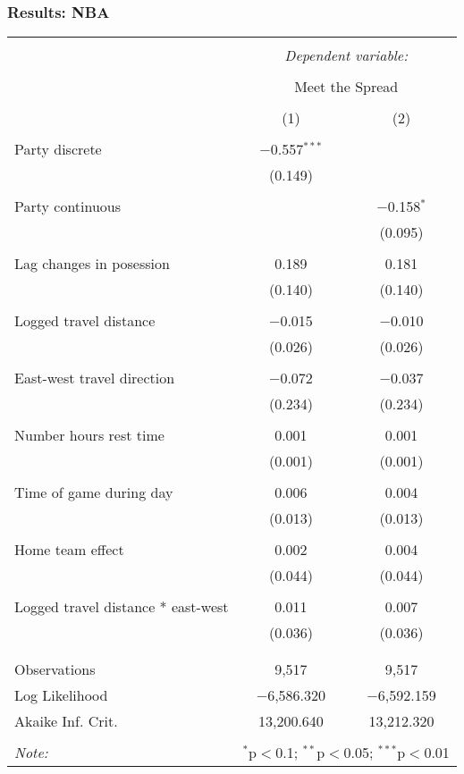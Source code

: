 \documentclass{beamer}
\begin{document}
\begin{frame}   \frametitle{Results: NBA}
  \vspace{-2pt}
  \centering
  \tiny{ %
\begin{tabular}{@{\extracolsep{5pt}}lcc}  \\[-1.8ex]\hline  \hline \\[-1.8ex]   & \multicolumn{2}{c}{\textit{Dependent variable:}} \\  \cline{2-3}  \\[-1.8ex] & \multicolumn{2}{c}{Meet the Spread} \\  \\[-1.8ex] & (1) & (2)\\  \hline \\[-1.8ex]   Party discrete & $-$0.557$^{***}$ &  \\    & (0.149) &  \\    & & \\   Party continuous &  & $-$0.158$^{*}$ \\    &  & (0.095) \\    & & \\   Lag changes in posession & 0.189 & 0.181 \\    & (0.140) & (0.140) \\    & & \\   Logged travel distance & $-$0.015 & $-$0.010 \\    & (0.026) & (0.026) \\    & & \\   East-west travel direction & $-$0.072 & $-$0.037 \\    & (0.234) & (0.234) \\    & & \\   Number hours rest time & 0.001 & 0.001 \\    & (0.001) & (0.001) \\    & & \\   Time of game during day & 0.006 & 0.004 \\    & (0.013) & (0.013) \\    & & \\   Home team effect & 0.002 & 0.004 \\    & (0.044) & (0.044) \\    & & \\   Logged travel distance * east-west & 0.011 & 0.007 \\    & (0.036) & (0.036) \\    & & \\  \hline \\[-1.8ex]  Observations & 9,517 & 9,517 \\  Log Likelihood & $-$6,586.320 & $-$6,592.159 \\  Akaike Inf. Crit. & 13,200.640 & 13,212.320 \\  \hline  \hline \\[-1.8ex]  \textit{Note:}  & \multicolumn{2}{r}{$^{*}$p$<$0.1; $^{**}$p$<$0.05; $^{***}$p$<$0.01} \\  \end{tabular}  }   
\end{frame}
\end{document}
